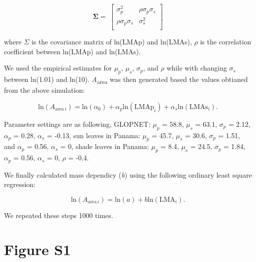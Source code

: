 \documentclass[
  12pt,
  letterpaper,
  DIV=11,
  numbers=noendperiod]{scrartcl}
\begin{document}
\[
\mathbf{\Sigma} = \
\begin{bmatrix}
\sigma_p^2 & \rho \sigma_p \sigma_s \\
\rho \sigma_p \sigma_s & \sigma_s^2 \\
\end{bmatrix}
\]

where \(\Sigma\) is the covariance matrix of ln(LMAp) and ln(LMAs),
\(\rho\) is the correlation coefficient between ln(LMAp) and ln(LMAs).

We used the empirical estimates for \(\mu_p\), \(\mu_s\), \(\sigma_p\),
and \(\rho\) while with changing \(\sigma_s\) between ln(1.01) and
ln(10). \emph{A}\textsubscript{area} was then generated based the values
obtianed from the above simulation:

\[
\mathrm{ln}(A_{\mathrm{area} \, i}) = \mathrm{ln}(\alpha_0) + \alpha_p\mathrm{ln}(\mathrm{LMAp}_{i}) + \alpha_s\mathrm{ln}(\mathrm{LMAs}_{i}).
\]

Parameter settings are as following, GLOPNET: \(\mu_p\) = 58.8,
\(\mu_s\) = 63.1, \(\sigma_p\) = 2.12, \(\alpha_p\) = 0.28, \(\alpha_s\)
= -0.13, sun leaves in Panama: \(\mu_p\) = 45.7, \(\mu_s\) = 30.6,
\(\sigma_p\) = 1.51, and \(\alpha_p\) = 0.56, \(\alpha_s\) = 0, shade
leaves in Panama: \(\mu_p\) = 8.4, \(\mu_s\) = 24.5, \(\sigma_p\) =
1.84, \(\alpha_p\) = 0.56, \(\alpha_s\) = 0, \(\rho\) = -0.4.

We finally calculated mass dependicy (\emph{b}) using the following
ordinary least square regression:

\[
\mathrm{ln}(A_{\mathrm{area} \, i}) = \mathrm{ln}(a) + b \mathrm{ln}(\mathrm{LMA}_{i}).
\]

We repeated these steps 1000 times.

\newpage

\hypertarget{figure-s1}{%
\section{Figure S1}\label{figure-s1}}
\end{document}
